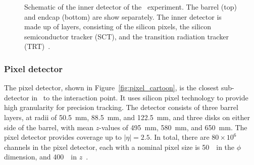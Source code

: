 \begin{figure}[p]
  \caption[
    Schematic of the inner detector of the
    \atlas\ experiment~\cite{1748-0221-3-08-S08003}.
  ]{
    Schematic of the inner detector of the \atlas\ experiment.
    The barrel (top) and endcap (bottom) are show separately.
    The inner detector is made up of layers, consisting of the silicon pixels,
    the silicon semiconductor tracker (SCT), and the transition radiation
    tracker (TRT)~\cite{1748-0221-3-08-S08003}.
  }
  \label{fig:id_cartoon}
\end{figure}

\subsubsection{Pixel detector} 
\label{sec:pixel}

The pixel detector, shown in Figure~\ref{fig:pixel_cartoon}, is the closest
sub-detector in \atlas\ to the interaction point.
It uses silicon pixel technology to provide high granularity for precision
tracking.
The detector consists of three barrel layers, at radii of 50.5~mm, 88.5~mm,
and 122.5~mm, and three disks on either side of the barrel, with mean $z$-values
of 495~mm, 580~mm, and 650~mm.
The pixel detector provides coverage up to $|\eta| = 2.5$.
In total, there are $80 \times 10^{6}$ channels in the pixel detector, each 
with a nominal pixel size is 50~\um\ in the $\phi$ dimension, and 400~\um\ in
$z$~\cite{1748-0221-3-07-P07007}.

